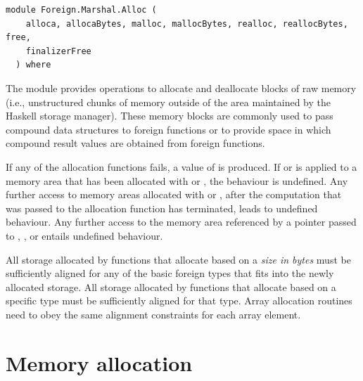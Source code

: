 \label{module:Foreign.Marshal.Alloc}
\haddockbeginheader
{\haddockverb\begin{verbatim}
module Foreign.Marshal.Alloc (
    alloca, allocaBytes, malloc, mallocBytes, realloc, reallocBytes, free,
    finalizerFree
  ) where\end{verbatim}}
\haddockendheader

The module  provides operations to allocate and
 deallocate blocks of raw memory (i.e., unstructured chunks of memory outside
 of the area maintained by the Haskell storage manager). These memory blocks
 are commonly used to pass compound data structures to foreign functions or to
 provide space in which compound result values are obtained from foreign
 functions.\par
If any of the allocation functions fails, a value of  is produced.
 If  or  is applied to a memory area that has been
 allocated with  or , the behaviour is undefined. Any
 further access to memory areas allocated with  or ,
 after the computation that was passed to the allocation function has
 terminated, leads to undefined behaviour. Any further access to the memory
 area referenced by a pointer passed to , , or 
 entails undefined behaviour.\par
All storage allocated by functions that allocate based on a \emph{size in bytes}
 must be sufficiently aligned for any of the basic foreign types that fits
 into the newly allocated storage. All storage allocated by functions that
 allocate based on a specific type must be sufficiently aligned for that type.
 Array allocation routines need to obey the same alignment constraints for
 each array element.\par
\section{Memory allocation}
